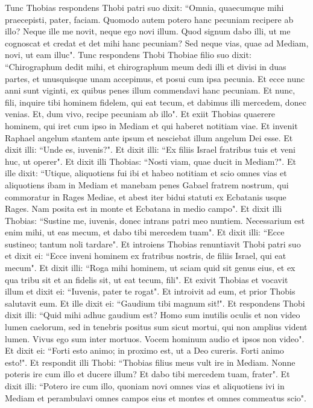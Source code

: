 \begin{biblechapter}  
\verse Tunc Thobias respondens Thobi patri suo dixit: “Omnia, quaecumque mihi praecepisti, pater, faciam. 
\verse Quomodo autem potero hanc pecuniam recipere ab illo? Neque ille me novit, neque ego novi illum. Quod signum dabo illi, ut me cognoscat et credat et det mihi hanc pecuniam? Sed neque vias, quae ad Mediam, novi, ut eam illuc". 
\verse Tunc respondens Thobi Thobiae filio suo dixit: “Chirographum dedit mihi, et chirographum meum dedi illi et divisi in duas partes, et unusquisque unam accepimus, et posui cum ipsa pecunia. Et ecce nunc anni sunt viginti, ex quibus penes illum commendavi hanc pecuniam. Et nunc, fili, inquire tibi hominem fidelem, qui eat tecum, et dabimus illi mercedem, donec venias. Et, dum vivo, recipe pecuniam ab illo". 
\verse Et exiit Thobias quaerere hominem, qui iret cum ipso in Mediam et qui haberet notitiam viae. Et invenit Raphael angelum stantem ante ipsum et nesciebat illum angelum Dei esse. 
\verse Et dixit illi: “Unde es, iuvenis?". Et dixit illi: “Ex filiis Israel fratribus tuis et veni huc, ut operer". Et dixit illi Thobias: “Nosti viam, quae ducit in Mediam?". 
\verse Et ille dixit: “Utique, aliquotiens fui ibi et habeo notitiam et scio omnes vias et aliquotiens ibam in Mediam et manebam penes Gabael fratrem nostrum, qui commoratur in Rages Mediae, et abest iter bidui statuti ex Ecbatanis usque Rages. Nam posita est in monte et Ecbatana in medio campo". 
\verse Et dixit illi Thobias: “Sustine me, iuvenis, donec intrans patri meo nuntiem. Necessarium est enim mihi, ut eas mecum, et dabo tibi mercedem tuam". 
\verse Et dixit illi: “Ecce sustineo; tantum noli tardare". 
\verse Et introiens Thobias renuntiavit Thobi patri suo et dixit ei: “Ecce inveni hominem ex fratribus nostris, de filiis Israel, qui eat mecum". Et dixit illi: “Roga mihi hominem, ut sciam quid sit genus eius, et ex qua tribu sit et an fidelis sit, ut eat tecum, fili". 
\verse Et exivit Thobias et vocavit illum et dixit ei: “Iuvenis, pater te rogat". Et introivit ad eum, et prior Thobis salutavit eum. Et ille dixit ei: “Gaudium tibi magnum sit!". Et respondens Thobi dixit illi: “Quid mihi adhuc gaudium est? Homo sum inutilis oculis et non video lumen caelorum, sed in tenebris positus sum sicut mortui, qui non amplius vident lumen. Vivus ego sum inter mortuos. Vocem hominum audio et ipsos non video". Et dixit ei: “Forti esto animo; in proximo est, ut a Deo cureris. Forti animo esto!". Et respondit illi Thobi: “Thobias filius meus vult ire in Mediam. Nonne poteris ire cum illo et ducere illum? Et dabo tibi mercedem tuam, frater". Et dixit illi: “Potero ire cum illo, quoniam novi omnes vias et aliquotiens ivi in Mediam et perambulavi omnes campos eius et montes et omnes commeatus scio". 

\end{biblechapter}
